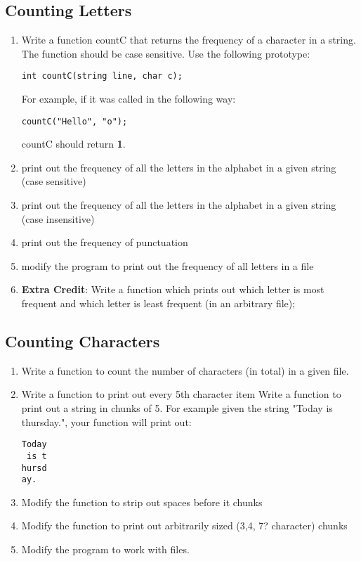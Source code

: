 \documentclass{article}
\begin{document}
\subsection{Counting Letters}
\begin{enumerate}
\item Write a function countC that returns the frequency of a character in a string. The function should be case sensitive. Use the following prototype:
\begin{verbatim}
int countC(string line, char c);
\end{verbatim}
For example, if it was called in the following way:
\begin{verbatim}
countC("Hello", "o");
\end{verbatim}
countC should return \textbf{1}.
\item print out the frequency of all the letters in the alphabet in a given string (case sensitive)
\item  print out the frequency of all the letters in the alphabet in a given string (case insensitive)
\item print out the frequency of punctuation
\item modify the program to print out the frequency of all letters in a file
\item \textbf{Extra Credit}: Write a function which prints out which letter is most frequent and which letter is least frequent (in an arbitrary file);
\end{enumerate}

\subsection{Counting Characters}
\begin{enumerate}
\item Write a function to count the number of characters (in total) in a given file. 
\item Write a function to print out every 5th character
item Write a function to print out a string in chunks of 5. For example given the string "Today is thursday.", your function will print out:
\begin{verbatim}
Today
 is t
hursd
ay.
\end{verbatim}
\item Modify the function to strip out spaces before it chunks
\item Modify the function to print out arbitrarily sized (3,4, 7? character) chunks
\item Modify the program to work with files.
\end{enumerate}
\end{document}
